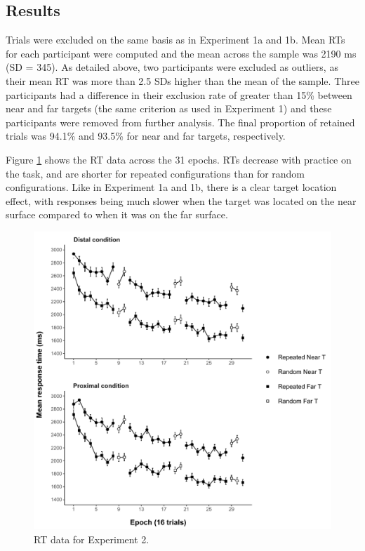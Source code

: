 \documentclass[
  english,
  man,floatsintext]{apa7}
\begin{document}
\hypertarget{results-1}{%
\subsection{Results}\label{results-1}}

Trials were excluded on the same basis as in Experiment 1a and 1b. Mean RTs for each participant were computed and the mean across the sample was 2190 ms (SD = 345). As detailed above, two participants were excluded as outliers, as their mean RT was more than 2.5 SDs higher than the mean of the sample. Three participants had a difference in their exclusion rate of greater than 15\% between near and far targets (the same criterion as used in Experiment 1) and these participants were removed from further analysis. The final proportion of retained trials was 94.1\% and 93.5\% for near and far targets, respectively.

Figure \ref{fig:Exp2-RT-figure} shows the RT data across the 31 epochs. RTs decrease with practice on the task, and are shorter for repeated configurations than for random configurations. Like in Experiment 1a and 1b, there is a clear target location effect, with responses being much slower when the target was located on the near surface compared to when it was on the far surface.



\begin{figure}

{\centering \includegraphics{CCVR_manuscript_files/figure-latex/Exp2-RT-figure-1} 

}

\caption{RT data for Experiment 2.}\label{fig:Exp2-RT-figure}
\end{figure}
\end{document}
